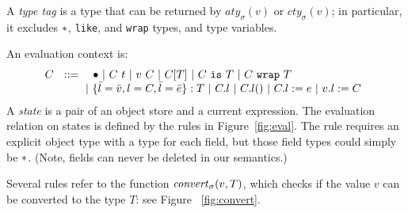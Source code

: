 \documentclass{article}
\newcommand{\fun}[1]{\mbox{\it #1\/}}
\newcommand{\lam}[4]{\lambda#1\!:\!#2.\,\,#4:#3}
\newcommand{\app}[2]{#1~#2}
\newcommand{\dynamic}{\t{*}}
\newcommand{\hole}{\bullet}
\newcommand{\App}[2]{#1[#2]}
\newcommand{\cast}[2]{#1~\t{is}~#2}
\newcommand{\convert}[2]{{#1}\convertword{#2}}
\newcommand{\convertword}{\mbox{\,\,$\sim :$\,\,}}
\renewcommand{\t}[1]{{\tt #1}}
\newcommand{\obje}[2]{\{#1\}:{#2}}
\newcommand{\objget}[2]{#1.#2}
\newcommand{\objcall}[2]{#1.#2()}
\newcommand{\objset}[3]{#1.#2:=#3}
\newcommand{\wrap}[2]{#1~\t{wrap}~#2}
\newcommand{\allocty}[1]{aty_{\sigma}(#1)}
\newcommand{\curty}[1]{cty_{\sigma}(#1)}
\renewcommand{\convert}[2]{\fun{convert}_{\sigma}(#1,#2)}
\begin{document}
A \emph{type tag} is a type that can be returned by $\allocty{v}$ or $\curty{v}$; in particular, it excludes $\dynamic$, \t{like}, and \t{wrap} types, and type variables.

An evaluation context is:
\[
C ~~::=
\begin{array}[t]{@{}l}
		~~~\hole
	~|~	\app{C}{t} 
	~|~	\app{v}{C}
	~|~	\App{C}{T} 
	~|~ \cast{C}{T} 
	~|~ \wrap{C}{T} \\
	~|~ \obje{\bar l=\bar v,l=C, \bar l =\bar e}{T}
	~|~ \objget{C}{l}
	~|~ \objcall{C}{l}
	~|~ \objset{C}{l}{e}
	~|~ \objset{v}{l}{C} 
\end{array}
\]
A \emph{state} is a pair of an object store and a current expression.
The evaluation relation on states is defined by the rules in Figure~\ref{fig:eval}.
The rule  requires an explicit object type with a type for each field,
but those field types could simply be $\dynamic$. (Note, fields can never be deleted in our semantics.)

Several rules refer to the function $\convert{v}{T}$, which checks if the value $v$ can be converted to the type $T$: 
see  Figure ~\ref{fig:convert}.  
\end{document}
